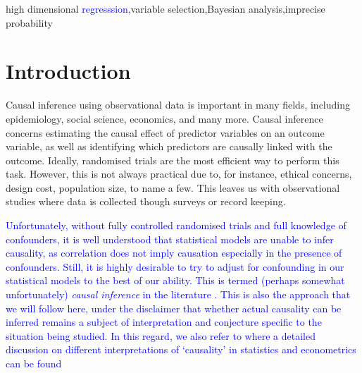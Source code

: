 \documentclass[preprint,12pt]{elsarticle}
\newcommand{\added}[1]{\textcolor{blue}{#1}}
\begin{document}
\begin{frontmatter}
\begin{abstract}
\end{abstract}

\begin{keyword}
  high dimensional \added{regresssion}\sep variable selection\sep Bayesian analysis\sep imprecise probability
\end{keyword}

\end{frontmatter}
\section{Introduction}\label{sec:intro}

Causal inference using observational data is important in
many fields, including epidemiology, social science, economics, and many more.
Causal inference concerns estimating the causal
effect of predictor variables on an outcome variable,
as well as identifying which predictors are causally linked with the outcome.
Ideally,
randomised trials are the most efficient way to perform this task.
However, this is not always practical due to, for instance, ethical 
concerns, design cost, population size, to name a few. This
leaves us with observational studies
where data is collected though surveys or record keeping.

\added{%
Unfortunately, without fully controlled randomised trials and full
knowledge of confounders, it is well understood that
statistical models are unable to infer causality, as correlation
does not imply causation especially in the presence of confounders.
Still, it is highly desirable to try to adjust for confounding in
our statistical models to the best of our ability. This is termed
(perhaps somewhat unfortunately) \emph{causal inference} in the
literature
\citep{rubin1978,rosenbaum83,Robins1986ANA,winship99,stuart10,Zigler2014,wang2015,koch2018,Hahn2018,koch2020}. 
This is also the approach that we will follow here, under the
disclaimer that whether actual causality can be inferred
remains a subject of interpretation and conjecture specific to the
situation being studied. In this regard, we also refer to \citep{imbiens_2022}
where a detailed discussion on different interpretations of `causality'
in statistics and econometrics can be found 
}
\end{document}
